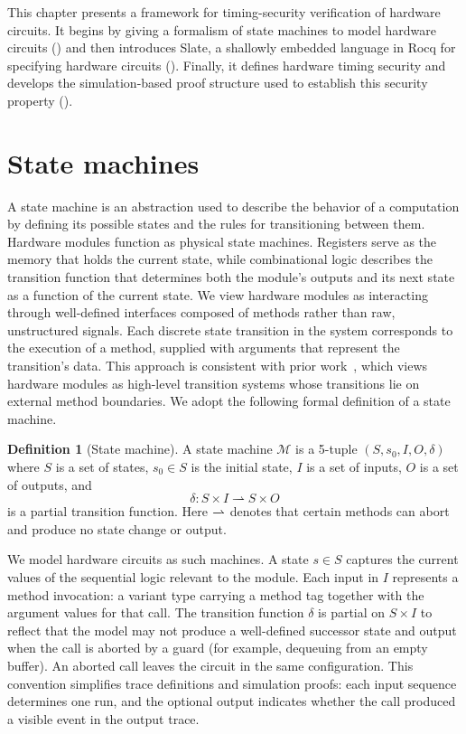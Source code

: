 \documentclass[fontset=fira-newtxsf]{mitthesis}
\theoremstyle{definition}
\newtheorem{definition}{Definition}[section]
\theoremstyle{plain}
\begin{document}
This chapter presents a framework for timing-security verification of hardware circuits.
It begins by giving a formalism of state machines to model hardware circuits () and then introduces Slate, a shallowly embedded language in Rocq for specifying hardware circuits ().
Finally, it defines hardware timing security and develops the simulation-based proof structure used to establish this security property ().

\section{State machines} \label{sec:timing-state-machine}

A state machine is an abstraction used to describe the behavior of a computation by defining its possible states and the rules for transitioning between them.
Hardware modules function as physical state machines.
Registers serve as the memory that holds the current state, while combinational logic describes the transition function that determines both the module's outputs and its next state as a function of the current state.
We view hardware modules as interacting through well-defined interfaces composed of methods rather than raw, unstructured signals.
Each discrete state transition in the system corresponds to the execution of a method, supplied with arguments that represent the transition's data.
This approach is consistent with prior work~\cite{choi2017,koika2020}, which views hardware modules as high-level transition systems whose transitions lie on external method boundaries.
We adopt the following formal definition of a state machine.

\begin{definition}[State machine]
  A state machine $\mathcal{M}$ is a 5-tuple $(S, s_0, I, O, \delta)$ where $S$ is a set of states, $s_0 \in S$ is the initial state, $I$ is a set of inputs, $O$ is a set of outputs, and
  \[
    \delta : S \times I \rightharpoonup S \times O
  \]
  is a partial transition function.
  Here $\xrightharpoonup{}$ denotes that certain methods can abort and produce no state change or output.
\end{definition}

We model hardware circuits as such machines.
A state $s \in S$ captures the current values of the sequential logic relevant to the module.
Each input in $I$ represents a method invocation: a variant type carrying a method tag together with the argument values for that call.
The transition function $\delta$ is partial on $S \times I$ to reflect that the model may not produce a well-defined successor state and output when the call is aborted by a guard (for example, dequeuing from an empty buffer).
An aborted call leaves the circuit in the same configuration.
This convention simplifies trace definitions and simulation proofs: each input sequence determines one run, and the optional output indicates whether the call produced a visible event in the output trace.
\end{document}
